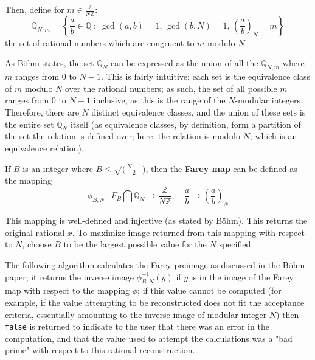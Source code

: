\documentclass[letterpaper,12pt,titlepage,oneside,final]{book}
\begin{document}
Then, define for ${m \in \frac{\mathbb{Z}}{N\mathbb{Z}}}$:
\begin{equation*}
  \mathbb{Q}_{N, m} = \left\{\frac{a}{b} \in \mathbb{Q}\; : \; \gcd(a, b) = 1,\, \gcd(b, N) = 1,\, \left(\frac{a}{b}\right)_N = m\right\}
\end{equation*}
the set of rational numbers which are congruent to ${m}$ modulo ${N}$.  

As B\"ohm states, the set ${\mathbb{Q}_N}$ can be expressed as the union of all the ${\mathbb{Q}_{N, m}}$ where ${m}$ ranges from 0 to ${N - 1}$.  This is fairly intuitive; each set is the equivalence class of ${m}$ modulo ${N}$ over the rational numbers; as such, the set of all possible ${m}$ ranges from 0 to ${N - 1}$ inclusive, as this is the range of the ${N}$-modular integers.  Therefore, there are ${N}$ distinct equivalence classes, and the union of these sets is the entire set ${\mathbb{Q}_N}$ itself (as equivalence classes, by definition, form a partition of the set the relation is defined over; here, the relation is modulo ${N}$, which is an equivalence relation).  

If ${B}$ is an integer where ${B \leq \sqrt(\frac{N - 1}{2})}$, then the \textbf{Farey map} can be defined as the mapping
\begin{equation*}
  \phi_{B, N}:\; F_B \bigcap \mathbb{Q}_N \rightarrow \frac{\mathbb{Z}}{N\mathbb{Z}},\quad \frac{a}{b} \rightarrow \left(\frac{a}{b}\right)_N
\end{equation*}

This mapping is well-defined and injective (as stated by B\"ohm).  This returns the original rational ${x}$.  To maximize image returned from this mapping with respect to ${N}$, choose ${B}$ to be the largest possible value for the ${N}$ specified.

The following algorithm calculates the Farey preimage as discussed in the B\"ohm paper; it returns the inverse image ${\phi_{B, N}^{-1}(y)}$ if ${y}$ is in the image of the Farey map with respect to the mapping ${\phi}$; if this value cannot be computed (for example, if the value attempting to be reconstructed does not fit the acceptance criteria, essentially amounting to the inverse image of modular integer ${N}$) then \texttt{false} is returned to indicate to the user that there was an error in the computation, and that the value used to attempt the calculations was a "bad prime" with respect to this rational reconstruction.
\end{document}
